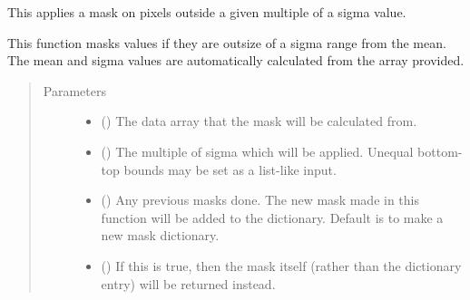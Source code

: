 \documentclass[letterpaper,10pt,english]{sphinxmanual}
\begin{document}
\begin{fulllineitems}
\label{\detokenize{python_docstrings/IfA_Smeargle.echo.masks.masks_echo200:IfA_Smeargle.echo.masks.masks_echo200.echo277_sigma_truncation}}
This applies a mask on pixels outside a given multiple of a sigma
value.

This function masks values if they are outsize of a sigma range from the
mean. The mean and sigma values are automatically calculated from the
array provided.
\begin{quote}\begin{description}
\item[{Parameters}] \leavevmode\begin{itemize}
\item {} 
 () \textendash{} The data array that the mask will be calculated from.

\item {} 
 () \textendash{} The multiple of sigma which will be applied. Unequal bottom-top bounds
may be set as a list-like input.

\item {} 
 (\sphinxstyleliteralemphasis{\sphinxupquote{ (}}\sphinxstyleliteralemphasis{\sphinxupquote{)}}) \textendash{} Any previous masks done. The new mask made in this function will be
added to the dictionary. Default is to make a new mask dictionary.

\item {} 
 (\sphinxstyleliteralemphasis{\sphinxupquote{ (}}\sphinxstyleliteralemphasis{\sphinxupquote{)}}) \textendash{} If this is true, then the mask itself (rather than the dictionary
entry) will be returned instead.


\end{itemize}
\end{description}
\end{quote}
\end{fulllineitems}
\end{document}
